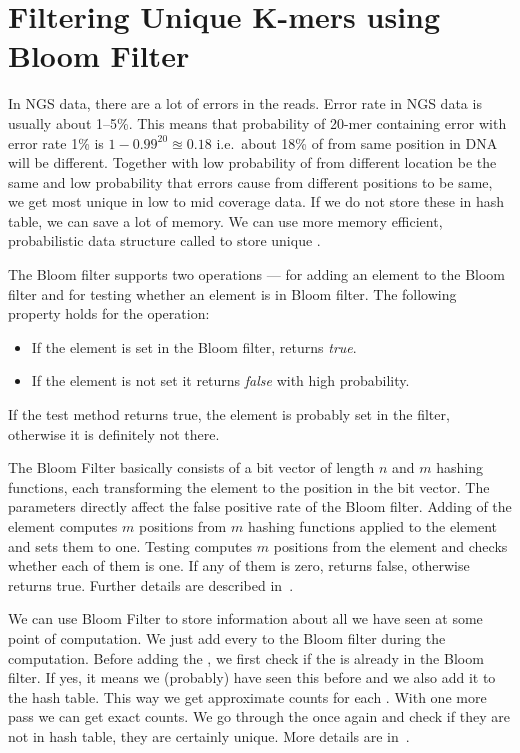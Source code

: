 \section{Filtering Unique K-mers using Bloom Filter}

In NGS data, there are a lot of errors in the reads. Error rate in NGS data is usually about 1--5\%. This means that probability of 20-mer containing error with error rate 1\% is $1 - 0.99^{20} \approxeq 0.18$ i.e.\ about 18\% of \kmers from same position in DNA will be different. Together with low probability of \kmers from different location be the same and low probability that errors cause \kmers from different positions to be same, we get most \kmers unique in low to mid coverage data. If we do not store these \kmers in hash table, we can save a lot of memory. We can use more memory efficient, probabilistic data structure called \cite{bloomfilter} to store unique \kmers.

The Bloom filter supports two operations ---  for adding an element to the Bloom filter and  for testing whether an element is in Bloom filter. The following property holds for the  operation:
\begin{itemize}
  \item If the element is set in the Bloom filter, returns \emph{true}.
  \item If the element is not set it returns \emph{false} with high probability.
\end{itemize}
If the test method returns true, the element is probably set in the filter, otherwise it is definitely not there.

The Bloom Filter basically consists of a bit vector of length $n$ and $m$ hashing functions, each transforming the element to the position in the bit vector. The parameters directly affect the false positive rate of the Bloom filter.
Adding of the element computes $m$ positions from $m$ hashing functions applied to the element and sets them to one.
Testing computes $m$ positions from the element and checks whether each of them is one. If any of them is zero, returns false, otherwise returns true. Further details are described in~\cite{bloomfilter}.

We can use Bloom Filter to store information about all \kmers we have seen at some point of computation. We just add every \kmer to the Bloom filter during the computation. Before adding the \kmer, we first check if the \kmer is already in the Bloom filter. If yes, it means we (probably) have seen this \kmer before and we also add it to the hash table. This way we get approximate counts for each \kmer.
With one more pass we can get exact counts. We go through the \kmers once again and check if they are not in hash table, they are certainly unique. More details are in~\cite{bfcounter}.

